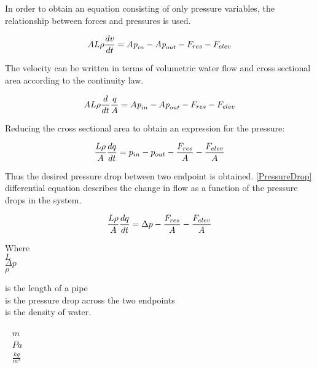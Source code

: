 In order to obtain an equation consisting of only pressure variables, the relationship between forces and pressures is used.


 \begin{equation}
    A L \rho \frac{dv}{dt} = A \textit{p}_{in} - A \textit{p}_{out} - F_{res} - F_{elev} \\
\end{equation}

The velocity can be written in terms of volumetric water flow and cross sectional area according to the continuity law.

\begin{equation}
    A L \rho \frac{d}{dt} \frac{q}{A} = A \textit{p}_{in} - A \textit{p}_{out} - F_{res} - F_{elev}\\
\end{equation}

Reducing the cross sectional area to obtain an expression for the pressure: 

\begin{equation}
    \frac{L \rho}{A} \frac{dq}{dt} =p_{in} - p_{out} - \frac{ F_{res}}{A} - \frac{ F_{elev}}{A} \\
\end{equation}

Thus the desired pressure drop between two endpoint is obtained. \eqref{PressureDrop} differential equation describes the change in flow as a function of the pressure drops in the system.

\begin{equation}
    \frac{L \rho}{A} \frac{dq}{dt} =\Delta p - \frac{ F_{res}}{A} - \frac{ F_{elev}}{A} \\
    \label{PressureDrop}
\end{equation}

 \begin{minipage}[t]{0.20\textwidth}
Where\\
\hspace*{8mm} $L$ \\
\hspace*{8mm} $\Delta p$ \\
\hspace*{8mm} $\rho$ 
\end{minipage}
\begin{minipage}[t]{0.68\textwidth}
\vspace*{2mm}
is the length of a pipe\\
is the pressure drop across the two endpoints\\
is the density of water.

\end{minipage}
\begin{minipage}[t]{0.10\textwidth}
\vspace*{2mm}
\textcolor{White}{te}$\unit{m}$\\
\textcolor{White}{te}$\unit{Pa}$\\
\textcolor{White}{te}$\unit{\frac{kg}{m^{3}}}$
\end{minipage}

